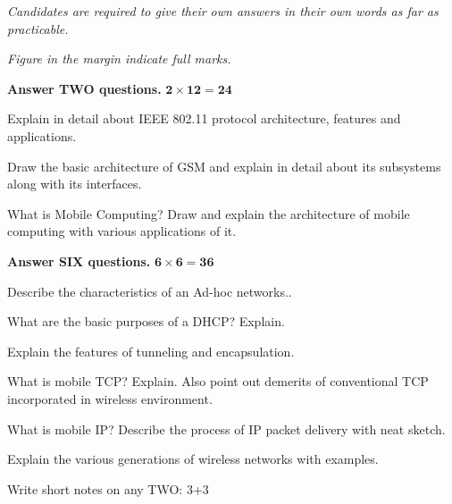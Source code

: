 \documentclass[a4paper, twoside, 12pt, noanswers]{exam}
\begin{document}
{\noindent \it{Candidates are required to give their own answers in their own words as far as practicable.  }\par}
{\noindent \it{Figure in the margin indicate full marks.}\par}

{}
{\hspace*{-0.5cm} \bfseries Answer TWO questions.} \hfill {\( \mathbf{2\times 12 =24}\)}

\begin{questions}
	\question Explain in detail about IEEE 802.11 protocol architecture,
	features and applications.

	\question Draw the basic architecture of GSM and explain in detail about
	its subsystems along with its interfaces.

	\question What is Mobile Computing? Draw and explain the architecture of
	mobile computing with various applications of it.


		{\par}
		{\hspace*{-0.5cm}\noindent\bfseries Answer SIX questions.} \hfill {\( \mathbf{6 \times 6 = 36}\)}

	\question  Describe the characteristics of an Ad-hoc networks..

	\question  What are the basic purposes of a DHCP? Explain.

	\question  Explain the features of tunneling and encapsulation.

	\question What is mobile TCP? Explain. Also point out demerits of
	conventional TCP incorporated in wireless environment.

	\question What is mobile IP? Describe the process of IP packet delivery with
	neat sketch.

	\question Explain the various generations of wireless networks with
	examples.

	\question  Write short notes on any TWO: 3+3

\nomorequestions
\end{questions}
\end{document}
